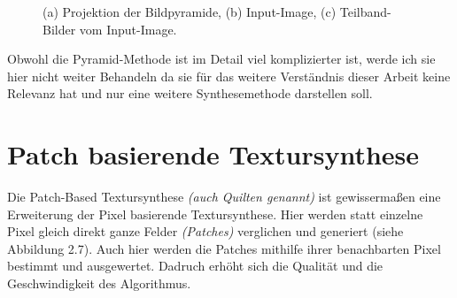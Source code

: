 \documentclass[12pt]{report}
\begin{document}
\begin{figure}[H]
    \centering
    \qquad
    \qquad
    \caption{(a) Projektion der Bildpyramide, (b) Input-Image, (c) Teilband-Bilder vom Input-Image.}%
\end{figure}

Obwohl die Pyramid-Methode ist im Detail viel komplizierter ist,
werde ich sie hier nicht weiter Behandeln da sie für das weitere Verständnis dieser Arbeit keine Relevanz hat und nur eine weitere Synthesemethode darstellen soll.

\section{Patch basierende Textursynthese}

Die Patch-Based Textursynthese \textit{(auch Quilten genannt)} ist gewissermaßen eine Erweiterung der Pixel basierende Textursynthese.
Hier werden statt einzelne Pixel gleich direkt ganze Felder \textit{(Patches)} verglichen und generiert {(siehe Abbildung 2.7)}.
Auch hier werden die Patches mithilfe ihrer benachbarten Pixel bestimmt und ausgewertet.
Dadruch erhöht sich die Qualität und die Geschwindigkeit des Algorithmus.
\end{document}
